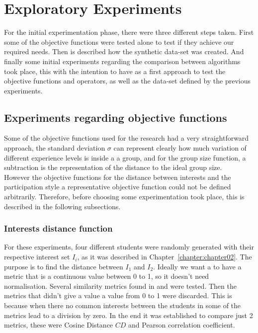 \chapter{Exploratory Experiments}
\label{chapter:chapter04}

For the initial experimentation phase, there were three different steps taken. First some of the objective functions were tested alone to test if they achieve our required needs. Then is described how the synthetic data-set was created. And finally some initial experiments regarding the comparison between algorithms took place, this with the intention to have as a first approach to test the objective functions and operators, as well as the data-set defined by the previous experiments.

\section{Experiments regarding objective functions}

Some of the objective functions used for the research had a very straightforward approach, the standard deviation $\sigma$ can represent clearly how much variation of different experience levels is inside a a group, and for the group size function, a subtraction is the representation of the distance to the ideal group size.\\ 

However the objective functions for the distance between interests and the participation style a representative objective function could not be defined arbitrarily. Therefore, before choosing some experimentation took place, this is described in the following subsections.\\

\subsection{Interests distance function}

For these experiments, four different students were randomly generated with their respective interest set $I_i$, as it was described in Chapter~\ref{chapter:chapter02}. The purpose is to find the distance between $I_1$ and $I_2$. Ideally we want a to have a metric that is a continuous value between 0 to 1, so it doesn't need normalisation. Several similarity metrics found in \cite{SeyedShirkhorshidi2015AData} and \cite{Sung-HyukChaComprehensiveFunctions} were tested. Then the metrics that didn't give a value a value from 0 to 1 were discarded. This is because when there no common interests between the students in some of the metrics lead to a division by zero. In the end it was established to compare just 2 metrics, these were Cosine Distance $CD$ and Pearson correlation coefficient.\\

